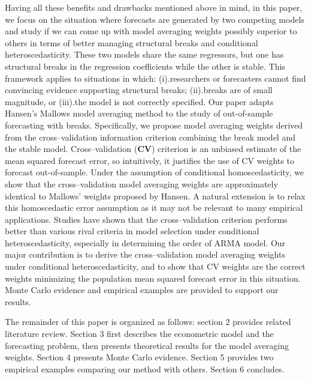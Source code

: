 Having all these benefits and drawbacks mentioned above in mind, in this paper, we focus on the situation where forecasts are generated by two competing models and study if we can come up with model averaging weights possibly superior to others in terms of better managing structural breaks and conditional heteroscedasticity. These two models share the same regressors, but one has structural breaks in the regression coefficients while the other is stable. This framework applies to situations in which: (i).researchers or forecasters cannot find convincing evidence supporting structural breaks; (ii).breaks are of small magnitude, or (iii).the model is not correctly specified. Our paper adapts Hansen's Mallows model averaging method \cite{hansen2009averaging} to the study of out-of-sample forecasting with breaks. Specifically, we propose model averaging weights derived from the cross--validation information criterion combining the break model and the stable model. Cross--validation (\textbf{CV}) criterion is an unbiased estimate of the mean squared forecast error, so intuitively, it justifies the use of CV weights to forecast out-of-sample. Under the assumption of conditional homoscedasticity, we show that the cross--validation model averaging weights are approximately identical to Mallows' weights proposed by Hansen. A natural extension is to relax this homoscedastic error assumption as it may not be relevant to many empirical applications. Studies have shown that the cross--validation criterion performs better than various rival criteria in model selection under conditional heteroscedasticity, especially in determining the order of ARMA model. Our major contribution is to derive the cross--validation model averaging weights under conditional heteroscedasticity, and to show that CV weights are the correct weights minimizing the population mean squared forecast error in this situation. Monte Carlo evidence and empirical examples are provided to support our results.

The remainder of this paper is organized as follows: section 2 provides related literature review. Section 3 first describes the econometric model and the forecasting problem, then presents theoretical results for the model averaging weights. Section 4 presents Monte Carlo evidence. Section 5 provides two empirical examples comparing our method with others. Section 6 concludes. 